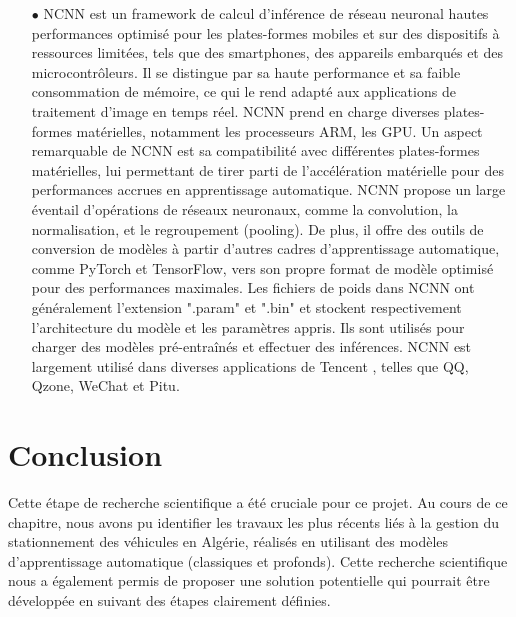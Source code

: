 \begin{itemize}
    \item [$\bullet$] NCNN est un framework de calcul d'inférence de réseau neuronal hautes performances optimisé pour les plates-formes mobiles et sur des dispositifs à ressources limitées, tels que des smartphones, des appareils embarqués et des microcontrôleurs. Il se distingue par sa haute performance et sa faible consommation de mémoire, ce qui le rend adapté aux applications de traitement d'image en temps réel. NCNN prend en charge diverses plates-formes matérielles, notamment les processeurs ARM, les GPU. Un aspect remarquable de NCNN est sa compatibilité avec différentes plates-formes matérielles, lui permettant de tirer parti de l'accélération matérielle pour des performances accrues en apprentissage automatique. NCNN propose un large éventail d'opérations de réseaux neuronaux, comme la convolution, la normalisation, et le regroupement (pooling). De plus, il offre des outils de conversion de modèles à partir d'autres cadres d'apprentissage automatique, comme PyTorch et TensorFlow, vers son propre format de modèle optimisé pour des performances maximales. Les fichiers de poids dans NCNN ont généralement l'extension ".param" et ".bin" et stockent respectivement l'architecture du modèle et les paramètres appris. Ils sont utilisés pour charger des modèles pré-entraînés et effectuer des inférences. NCNN est largement utilisé dans diverses applications de Tencent \cite{ch2_GitHubTe84}, telles que QQ, Qzone, WeChat et Pitu.
\end{itemize}

 \section{Conclusion}

Cette étape de recherche scientifique a été cruciale pour ce projet. Au cours de ce chapitre, nous avons pu identifier les travaux les plus récents liés à la gestion du stationnement des véhicules en Algérie, réalisés en utilisant des modèles d'apprentissage automatique (classiques et profonds). Cette recherche scientifique nous a également permis de proposer une solution potentielle qui pourrait être développée en suivant des étapes clairement définies.







